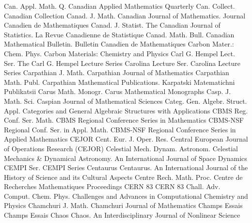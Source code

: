 {Can. Appl. Math. Q.}
{Canadian Applied Mathematics Quarterly}
{Can. Collect.}
{Canadian Collection}
{Canad. J. Math.}
{Canadian Journal of Mathematics. Journal Canadien de Mathematiques}
{Canad. J. Statist.}
{The Canadian Journal of Statistics. La Revue Canadienne de Statistique}
{Canad. Math. Bull.}
{Canadian Mathematical Bulletin. Bulletin Canadien de Mathematiques}
{Carbon Mater.: Chem. Phys.}
{Carbon Materials: Chemistry and Physics}
{Carl G. Hempel Lect. Ser.}
{The Carl G. Hempel Lecture Series}
{Carolina Lecture Ser.}
{Carolina Lecture Series}
{Carpathian J. Math.}
{Carpathian Journal of Mathematics}
{Carpathian Math. Publ.}
{Carpathian Mathematical Publications. Karpatski Matematichni Publikatsii}
{Carus Math. Monogr.}
{Carus Mathematical Monographs}
{Casp. J. Math. Sci.}
{Caspian Journal of Mathematical Sciences}
{Categ. Gen. Algebr. Struct. Appl.}
{Categories and General Algebraic Structures with Applications}
{CBMS Reg. Conf. Ser. Math.}
{CBMS Regional Conference Series in Mathematics}
{CBMS-NSF Regional Conf. Ser. in Appl. Math.}
{CBMS-NSF Regional Conference Series in Applied Mathematics}
{CEJOR Cent. Eur. J. Oper. Res.}
{Central European Journal of Operations Research (CEJOR)}
{Celestial Mech. Dynam. Astronom.}
{Celestial Mechanics & Dynamical Astronomy. An International Journal of Space Dynamics}
{CEMPI Ser.}
{CEMPI Series}
{Centaurus}
{Centaurus. An International Journal of the History of Science and its Cultural Aspects}
{Centre Rech. Math. Proc.}
{Centre de Recherches Mathematiques Proceedings}
{CERN 83}
{CERN 83}
{Chall. Adv. Comput. Chem. Phys.}
{Challenges and Advances in Computational Chemistry and Physics}
{Chamchuri J. Math.}
{Chamchuri Journal of Mathematics}
{Champs Essais}
{Champs Essais}
{Chaos}
{Chaos. An Interdisciplinary Journal of Nonlinear Science}
